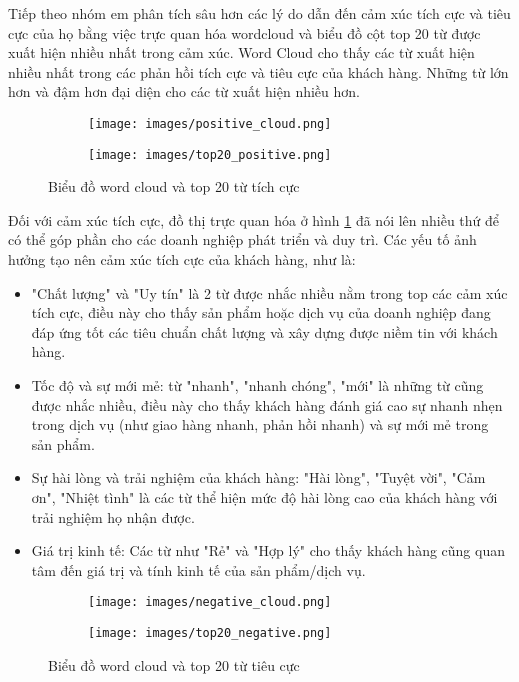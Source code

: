 Tiếp theo nhóm em phân tích sâu hơn các lý do dẫn đến cảm xúc tích cực và tiêu cực của họ bằng việc trực quan hóa wordcloud và biểu đồ cột top 20 từ được xuất hiện nhiều nhất trong cảm xúc. Word Cloud cho thấy các từ xuất hiện nhiều nhất trong các phản hồi tích cực và tiêu cực của khách hàng. Những từ lớn hơn và đậm hơn đại diện cho các từ xuất hiện nhiều hơn.

\begin{figure}[htb]
    \centering
    \begin{subfigure}
        \centering
        \texttt{[image: images/positive\_cloud.png]}
    \end{subfigure}
    \hfill
    \begin{subfigure}
        \centering
        \texttt{[image: images/top20\_positive.png]}
    \end{subfigure}
    \caption{Biểu đồ word cloud và top 20 từ tích cực}
    \label{positive_words_cloud}
\end{figure}

Đối với cảm xúc tích cực, đồ thị trực quan hóa ở hình \ref{positive_words_cloud} đã nói lên nhiều thứ để có thể góp phần cho các doanh nghiệp phát triển và duy trì. Các yếu tố ảnh hưởng tạo nên cảm xúc tích cực của khách hàng, như là:

\begin{itemize}
    \item "Chất lượng" và "Uy tín" là 2 từ được nhắc nhiều nằm trong top các cảm xúc tích cực, điều này cho thấy sản phẩm hoặc dịch vụ của doanh nghiệp đang đáp ứng tốt các tiêu chuẩn chất lượng và xây dựng được niềm tin với khách hàng.
    \item Tốc độ và sự mới mẻ: từ "nhanh", "nhanh chóng", "mới" là những từ cũng được nhắc nhiều, điều này cho thấy khách hàng đánh giá cao sự nhanh nhẹn trong dịch vụ (như giao hàng nhanh, phản hồi nhanh) và sự mới mẻ trong sản phẩm.
    \item Sự hài lòng và trải nghiệm của khách hàng: "Hài lòng", "Tuyệt vời", "Cảm ơn", "Nhiệt tình" là các từ thể hiện mức độ hài lòng cao của khách hàng với trải nghiệm họ nhận được.
    \item Giá trị kinh tế: Các từ như "Rẻ" và "Hợp lý" cho thấy khách hàng cũng quan tâm đến giá trị và tính kinh tế của sản phẩm/dịch vụ.
\end{itemize}


\begin{figure}[htb]
    \centering
    \begin{subfigure}
        \centering
        \texttt{[image: images/negative\_cloud.png]}
    \end{subfigure}
    \hfill
    \begin{subfigure}
        \centering
        \texttt{[image: images/top20\_negative.png]}
    \end{subfigure}
    \caption{Biểu đồ word cloud và top 20 từ tiêu cực}
    \label{negative_words_cloud}
\end{figure}

